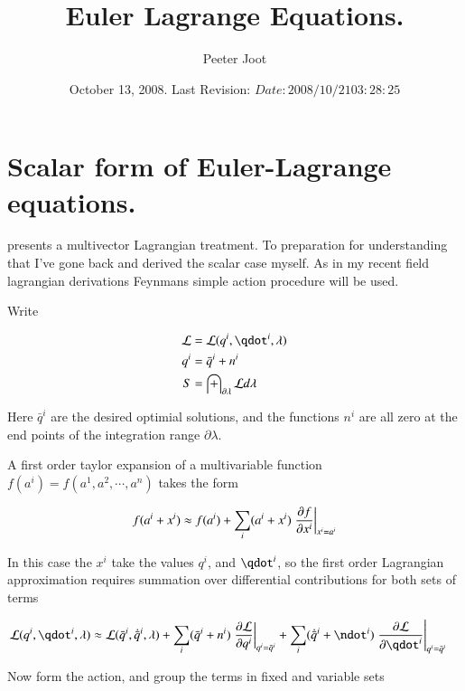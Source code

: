 \documentclass{article}
\title{Euler Lagrange Equations.}
\author{Peeter Joot}
\date{ October 13, 2008.  Last Revision: $Date: 2008/10/21 03:28:25 $ }
\newcommand{\qbar}[0]{\bar{q}}
\newcommand{\qdotbar}[0]{\dot{\bar{q}}}
\begin{document}
\maketitle{}

\tableofcontents

\section{Scalar form of Euler-Lagrange equations.}

\cite{lasenby1993mda} presents a multivector Lagrangian treatment.  To
preparation for understanding that I've gone 
back and derived the scalar
case myself.  As in my recent field lagrangian derivations Feynmans
\cite{feynman1963flp} simple action procedure will be used.

Write 

\begin{align*}
\LL &= \LL(q^i, \qdot^i, \lambda) \\
q^i &= \qbar^i + n^i \\
S &= \int_{\partial \lambda} \LL d\lambda
\end{align*}

Here $\qbar^i$ are the desired optimial solutions, and the functions $n^i$
are all zero at the end points of the integration range $\partial \lambda$.

A first order taylor expansion of a multivariable function
$f(a^i) = f(a^1, a^2, \cdots, a^n)$
takes the form

\begin{align*}
f(a^i + x^i) \approx f(a^i) + \sum_i (a^i + x^i) \left. \PD{x^i}{f} \right\vert_{x^i = a^i}
\end{align*}

In this case the $x^i$ take the values $q^i$, and $\qdot^i$, so the first
order Lagrangian approximation requires summation over differential contributions for both sets of terms

\begin{align}\label{eqn:linearizedLagrangian}
\LL(q^i, \qdot^i, \lambda) 
&\approx \LL(\qbar^i, \qdotbar^i, \lambda) 
+ \sum_i (\qbar^i + n^i) \left. \PD{q^i}{\LL} \right\vert_{q^i = \qbar^i}
+ \sum_i (\qdotbar^i + \ndot^i) \left. \PD{\qdot^i}{\LL} \right\vert_{q^i = \qbar^i}
\end{align}

%
Now form the action, and group the terms in fixed and variable sets
\end{document}
